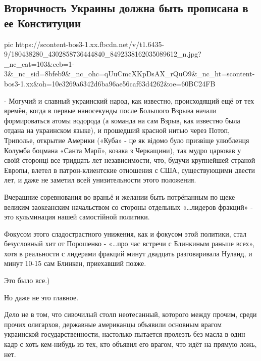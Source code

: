  
 
 
 
 
\subsection{Вторичность Украины должна быть прописана в ее Конституции}

\ifcmt
  pic https://scontent-bos3-1.xx.fbcdn.net/v/t1.6435-9/180438280_4302858736444840_8492338162035089612_n.jpg?_nc_cat=103&ccb=1-3&_nc_sid=8bfeb9&_nc_ohc=qUuCmcXKpDsAX_rQuO9&_nc_ht=scontent-bos3-1.xx&oh=10e3269a6342d6ba96ae56caf63d4262&oe=60BC24FB
\fi

- Могучий и славный украинский народ, как известно, происходящий ещё от тех
времён, когда в первые наносекунды после Большого Взрыва начали формироваться
атомы водорода (а команда на сам Взрыв, как известно была отдана на украинском
языке), и прошедший красной нитью через Потоп, Триполье, открытие Америки
(«Куба» - це як відомо було призвіще улюбленця Колумба боцмана «Санта Марії»,
козака з Черкащини), так мудро царював у своїй сторонці все тридцать лет
независимости, что, будучи крупнейшей страной Европы, влетел в
патрон-клиентские отношения с США, существующими двести лет, и даже не заметил
всей унизительности этого положения.

Вчерашние соревнования во враньё и желании быть потрёпанным по щеке великим
заокеанским начальством со стороны отдельных «…лидеров фракций» - это
кульминация нашей самостійной политики.

Фокусом этого сладострастного унижения, как и фокусом этой политики, стал
безусловный хит от Порошенко - «…про час встречи с Блинкиным раньше всех», хотя
в реальности с лидерами фракций минут двадцать разговаривала Нуланд, и минут
10-15 сам Блинкен, приехавший позже.

Это было все.)

Но даже не это главное.

Дело не в том, что сивочилый столп неотесанный, которого между прочим, среди
прочих олигархов, державные американцы объявили основным врагом украинской
государственности, настолько пытается пролезть без масла в один кадр с хоть
кем-нибудь из тех, кто объявил его врагом, что идёт на прямую ложь, нет.

